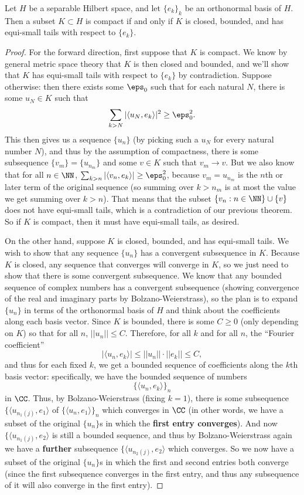 \begin{theorem} 
Let $H$ be a separable Hilbert space, and let $\{e_k\}_k$ be an orthonormal basis of $H$. Then a subset $K \subset H$ is compact if and only if $K$ is closed, bounded, and has equi-small tails with respect to $\{e_k\}$.
\end{theorem}
\begin{proof}
For the forward direction, first suppose that $K$ is compact. We know by general metric space theory that $K$ is then closed and bounded, and we'll show that $K$ has equi-small tails with respect to $\{e_k\}$ by contradiction. Suppose otherwise: then there exists some $\eps_0$ such that for each natural $N$, there is some $u_N \in K$ such that
\[
     \sum_{k>N} |\langle u_N, e_k \rangle|^2 \ge \eps_0^2.
\]
This then gives us a sequence $\{u_n\}$ (by picking such a $u_N$ for every natural number $N$), and thus by the assumption of compactness, there is some subsequence $\{v_m\} = \{u_{n_m}\}$ and some $v \in K$ such that $v_m \to v$. But we also know that for all $n \in \NN$, $\sum_{k>n} |\langle v_n, e_k \rangle| \ge \eps_0^2$, because $v_m = u_{n_m}$ is the $n$th or later term of the original sequence (so summing over $k > n_m$ is at most the value we get summing over $k > n$). That means that the subset $\{v_n: n \in \NN\} \cup \{v\}$ does not have equi-small tails, which is a contradiction of our previous theorem. So if $K$ is compact, then it must have equi-small tails, as desired. 

On the other hand, suppose $K$ is closed, bounded, and has equi-small tails. We wish to show that any sequence $\{u_n\}$ has a convergent subsequence in $K$. Because $K$ is closed, any sequence that converges will converge in $K$, so we just need to show that there is some convergent subsequence. We know that any bounded sequence of complex numbers has a convergent subsequence (showing convergence of the real and imaginary parts by Bolzano-Weierstrass), so the plan is to expand $\{u_n\}$ in terms of the orthonormal basis of $H$ and think about the coefficients along each basis vector. Since $K$ is bounded, there is some $C \ge 0$ (only depending on $K$) so that for all $n$, $||u_n|| \le C$. Therefore, for all $k$ and for all $n$, the ``Fourier coefficient'' 
\[
    |\langle u_n, e_k \rangle| \le ||u_n|| \cdot ||e_k|| \le C,
\]
and thus for each fixed $k$, we get a bounded sequence of coefficients along the $k$th basis vector: specifically, we have the bounded sequence of numbers
\[
    \{\langle u_n, e_k \rangle\}_n
\]
in $\CC$. Thus, by Bolzano-Weierstrass (fixing $k = 1$), there is some subsequence $\{\langle u_{n_1(j)}, e_1 \rangle$ of $\{\langle u_n, e_1 \rangle\}_n$ which converges in $\CC$ (in other words, we have a subset of the original $\{u_n\}$s in which the \textbf{first entry converges}). And now $\{\langle u_{n_1(j)}, e_2 \rangle$ is still a bounded sequence, and thus by Bolzano-Weierstrass again we have a \textbf{further} subsequence $\{\langle u_{n_2(j)}, e_2 \rangle$ which converges. So we now have a subset of the original $\{u_n\}$s in which the first and second entries both converge (since the first subsequence converges in the first entry, and thus any subsequence of it will also converge in the first entry). 


\end{proof}
